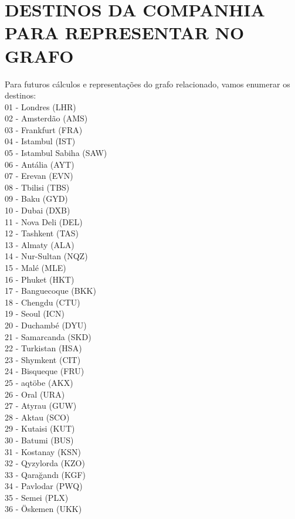 \section{DESTINOS DA COMPANHIA PARA REPRESENTAR NO GRAFO}
Para futuros cálculos e representações do grafo relacionado, vamos enumerar os destinos:\\
01 - Londres (LHR)\\
02 - Amsterdão (AMS)\\
03 - Frankfurt (FRA)\\
04 - Istambul (IST)\\
05 - Istambul Sabiha (SAW)\\
06 - Antália (AYT)\\
07 - Erevan (EVN)\\
08 - Tbilisi (TBS)\\
09 - Baku (GYD)\\
10 - Dubai (DXB)\\
11 - Nova Deli (DEL)\\
12 - Tashkent (TAS)\\
13 - Almaty (ALA)\\
14 - Nur-Sultan (NQZ)\\
15 - Malé (MLE)\\
16 - Phuket (HKT)\\
17 - Banguecoque (BKK)\\
18 - Chengdu (CTU)\\
19 - Seoul (ICN)\\
20 - Duchambé (DYU)\\
21 - Samarcanda (SKD)\\
22 - Turkistan (HSA)\\
23 - Shymkent (CIT)\\
24 - Bisqueque (FRU)\\
25 - aqtöbe (AKX)\\
26 - Oral (URA)\\
27 - Atyrau (GUW)\\
28 - Aktau (SCO)\\
29 - Kutaisi (KUT)\\
30 - Batumi (BUS)\\
31 - Kostanay (KSN)\\
32 - Qyzylorda (KZO)\\
33 - Qarağandı (KGF)\\
34 - Pavlodar (PWQ)\\
35 - Semei (PLX)\\
36 - Öskemen (UKK)\\
